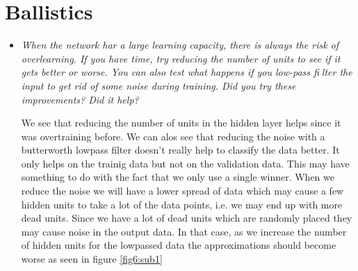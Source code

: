 \documentclass[a4paper,11pt]{article}
\begin{document}
\section{Ballistics}
\begin{itemize}

\item \textit{When the network har a large learning capacity, there is always the risk of overlearning. If you have time, try reducing the number of units to see if it gets better or worse. You can also test what happens if you low-pass filter the input to get rid of some noise during training. Did you try these improvements? Did it help?}

We see that reducing the number of units in the hidden layer helps since it was overtraining before. We can alos see that reducing the noise with a butterworth lowpass filter doesn't really help to classify the data better. It only helps on the trainig data but not on the validation data. This may have something to do with the fact that we only use a single winner. When we reduce the noise we will have a lower spread of data which may cause a few hidden units to take a lot of the data points, i.e. we may end up with more dead units. Since we have a lot of dead units which are randomly placed they may cause noise in the output data. In that case, as we increase the number of hidden units for the lowpassed data the approximations should become worse as seen in figure \ref{fig6:sub1}

\begin{figure}[h!]
\label{fig6}
\caption{}
\end{figure}

\end{itemize}
\end{document}
